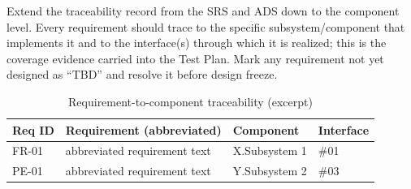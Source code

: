 Extend the traceability record from the SRS and ADS down to the component level. Every requirement should trace to the specific subsystem/component that implements it and to the interface(s) through which it is realized; this is the coverage evidence carried into the Test Plan. Mark any requirement not yet designed as ``TBD'' and resolve it before design freeze.

\begin{table}[H]
\caption{Requirement-to-component traceability (excerpt)}
\begin{center}
    \begin{tabular}{ | p{2cm} | p{5cm} | p{4cm} | p{2cm} |}
    \hline
    \textbf{Req ID} & \textbf{Requirement (abbreviated)} & \textbf{Component} & \textbf{Interface} \\ \hline
    FR-01 & abbreviated requirement text & X.Subsystem 1 & \#01 \\ \hline
    PE-01 & abbreviated requirement text & Y.Subsystem 2 & \#03 \\ \hline
    \end{tabular}
\end{center}
\end{table}
